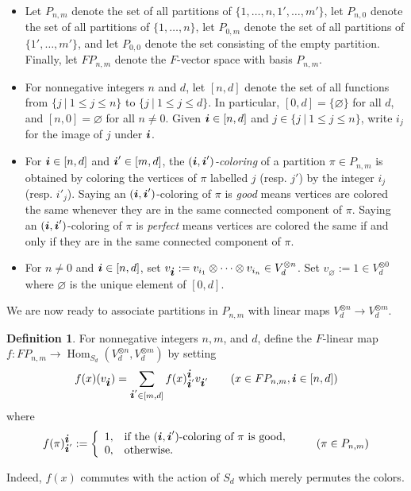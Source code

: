 \documentclass{amsart}
\def\bd#1{\mbox{\boldmath${#1}$}}
\theoremstyle{definition}
\newtheorem{definition}[theorem]{Definition}
\newcommand{\Hom}{\operatorname{Hom}}
\renewcommand{\1}{_{(1)}}
\renewcommand{\2}{_{(2)}}
\newcommand{\3}{_{(3)}}
\newcommand{\4}{_{(4)}}
\begin{document}
\begin{itemize}\item Let $P_{n,m}$ denote the set of all partitions of $\{1,\ldots, n, 1',\ldots, m'\}$, let $P_{n,0}$ denote the set of all partitions of $\{1,\ldots, n\}$, let $P_{0,m}$ denote the set of all partitions of $\{1',\ldots, m'\}$, and let $P_{0,0}$ denote the set consisting of the empty partition.  Finally,  let $ F P_{n, m}$ denote the $ F$-vector space with basis $P_{n,m}$.

\item For nonnegative integers $n$ and $d$, let $[n, d]$ denote the set of all functions from $\{j~|~1\leq j\leq n\}$ to $\{j~|~1\leq j\leq d\}$.  In particular, $[0, d]=\{\varnothing\}$ for all $d$, and $[n, 0]=\varnothing$ for all $n\not=0$.   Given ${\bd{i}}\in[n, d]$ and $j\in\{j~|~1\leq j\leq n\}$, write $i_j$ for the image of $j$ under ${\bd{i}}$.

\item For ${\bd{i}}\in[n, d]$ and ${\bd{i}}'\in[m, d]$, the \emph{$({\bd{i}}, {\bd{i}}')$-coloring} of a partition $\pi\in P_{n, m}$ is obtained by coloring the vertices of $\pi$ labelled $j$ (resp. $j'$) by the integer $i_j$ (resp. $i'_j$).  
Saying an $({\bd{i}}, {\bd{i}}')$-coloring of $\pi$ is \emph{good} means vertices are colored the same whenever they are in the same connected component of $\pi$.  Saying an $({\bd{i}}, {\bd{i}}')$-coloring of $\pi$ is \emph{perfect} means vertices are colored the same if and only if they are in the same connected component of $\pi$. 

\item For $n\not=0$ and ${\bd{i}}\in[n, d]$, set $v_{\bd{i}}:=v_{i_1}\otimes\cdots\otimes v_{i_n}\in V_d^{\otimes n}$.   Set $v_\varnothing:=1\in V^{\otimes0}_d$ where $\varnothing$ is the unique element of $[0, d]$.  

\end{itemize}

We are now ready to associate partitions in $P_{n,m}$ with linear maps $V_d^{\otimes n}\to V^{\otimes m}_d$.

\begin{definition}\label{f} For nonnegative integers $n, m$, and $d$, define the $F$-linear map $f:FP_{n, m}\to\Hom_{S_d}(V_d^{\otimes n}, V_d^{\otimes m})$ by setting  $$f(x)(v_{\bd{i}})=\sum_{{\bd{i}}'\in[m, d]}f(x)^{\bd{i}}_{ {\bd{i}}'}v_{{\bd{i}}'}\qquad (x\in FP_{n, m}, \bd{i}\in[n, d])$$ where 
$$f(\pi)^{\bd{i}}_{{\bd{i}}'}:=\left\{\begin{array}{ll}
1, & \text{if the $({\bd{i}}, {\bd{i}}')$-coloring of $\pi$ is good},\\
0, & \text{otherwise}.
\end{array}\right.\qquad (\pi\in P_{n,m})$$
\end{definition}
Indeed, $f(x)$ commutes with the action of $S_d$ which merely permutes the colors.
\end{document}
